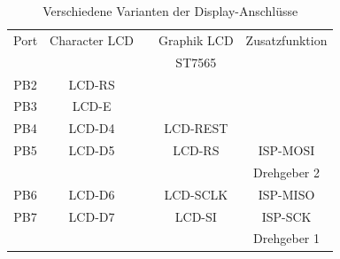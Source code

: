 \begin{table}[H]
  \begin{center}
    \begin{tabular}{| c || c | c | c | c |}
    \hline
      Port & Character LCD &              & Graphik LCD  & Zusatzfunktion      \\
           &               &              &  ST7565      &                     \\
    \hline
    \hline
    PB2    &  LCD-RS         &            &             &       \\
    \hline
    PB3    &  LCD-E          &            &             &       \\
    \hline
    PB4    &  LCD-D4         &            &  LCD-REST   &       \\
    \hline
    PB5    &  LCD-D5         &            &  LCD-RS     & ISP-MOSI \\
           &                 &            &             & Drehgeber 2 \\
    \hline
    PB6    &  LCD-D6         &            &  LCD-SCLK   & ISP-MISO \\
    \hline
    PB7    &  LCD-D7         &            &  LCD-SI     & ISP-SCK  \\
           &                 &            &             & Drehgeber 1 \\
    \hline
    \end{tabular}
  \end{center}
  \caption{Verschiedene Varianten der Display-Anschlüsse}
  \label{tab:mega644-display}
\end{table}



